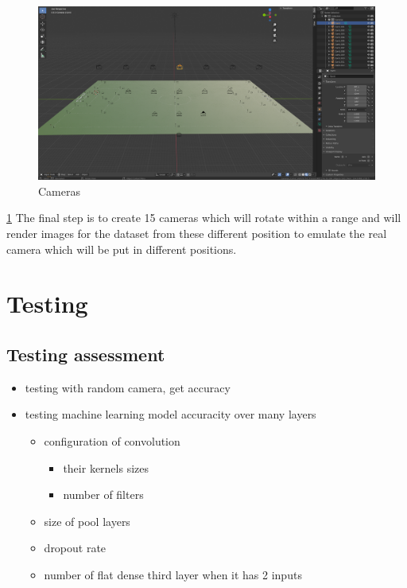 \documentclass[
11pt,
twoside
]{report}
\begin{document}
\begin{figure}[H]
    \includegraphics[keepaspectratio, width=\columnwidth]{Screenshot_2022-03-05_12-05-23.png}
    \caption{Cameras}
    \label{img:cameras}
\end{figure}
\ref{img:cameras} The final step is to create 15 cameras which will rotate within a range and will render images for the dataset from these different position to emulate the real camera which will be put in different positions.





\chapter{Testing}



\section{Testing assessment}

\begin{itemize}
\item
  testing with random camera, get accuracy
\item
  testing machine learning model accuracity over many layers
  \begin{itemize}
  \item
    configuration of convolution
    \begin{itemize}
    \item
      their kernels sizes
    \item
      number of filters
    \end{itemize}
  \item
    size of pool layers
  \item
    dropout rate
  \item
    number of flat dense third layer when it has 2 inputs
  \end{itemize}
\end{itemize}
\end{document}
